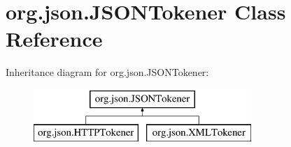 \hypertarget{classorg_1_1json_1_1JSONTokener}{\section{org.\-json.\-J\-S\-O\-N\-Tokener Class Reference}
\label{classorg_1_1json_1_1JSONTokener}
}
Inheritance diagram for org.\-json.\-J\-S\-O\-N\-Tokener\-:\begin{figure}[H]
\begin{center}
\leavevmode
\includegraphics[height=2.000000cm]{classorg_1_1json_1_1JSONTokener}
\end{center}
\end{figure}
